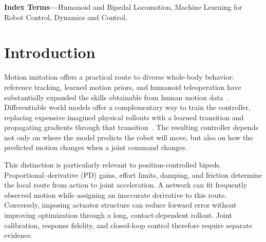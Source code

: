 \begin{abstract}
Differentiable world models expose a controller to errors in both predicted motion and command sensitivity. We study an actuator-structured transition for the 26-joint Z01 biped and distinguish these two errors from closed-loop performance. The framework combines identified joint parameters, an explicit effort channel, and paired finite-amplitude response diagnostics. An analysis of branch errors and perturbation noise explains why improved trajectory fit need not yield better response or control. Archived parameter-set comparisons improve angle, velocity, and torque prediction on seven of eight joint records. A current online study completes 31 matched training-seed pairs, each with 5000 policy and 25000 world-model updates. Mean completion on 163 reference clips is 89.11\%/89.85\% for the matched/structured models on the 4090 cohort and 88.90\%/87.79\% on the 5080 cohort. Mean paired calibration angle-error reductions are 3.09\% and 5.30\%, respectively, without consistent control improvement. Full CPU/GPU checks fail on 65 and 67 of 516 response blocks in two independent processes. These findings support a forward-prediction benefit in the studied setting while identifying response validity and policy optimization as unresolved conditions for stronger control claims.
\end{abstract}

\noindent\textbf{Index Terms---}Humanoid and Bipedal Locomotion, Machine Learning for Robot Control, Dynamics and Control.

\section{Introduction}
Motion imitation offers a practical route to diverse whole-body behavior: reference tracking, learned motion priors, and humanoid teleoperation have substantially expanded the skills obtainable from human motion data~\cite{deepmimic,amp,omnih2o}. Differentiable world models offer a complementary way to train the controller, replacing expensive imagined physical rollouts with a learned transition and propagating gradients through that transition~\cite{supermimic}. The resulting controller depends not only on where the model predicts the robot will move, but also on how the predicted motion changes when a joint command changes.

This distinction is particularly relevant to position-controlled bipeds. Proportional--derivative (PD) gains, effort limits, damping, and friction determine the local route from action to joint acceleration. A network can fit frequently observed motion while assigning an inaccurate derivative to this route. Conversely, imposing actuator structure can reduce forward error without improving optimization through a long, contact-dependent rollout. Joint calibration, response fidelity, and closed-loop control therefore require separate evidence.

